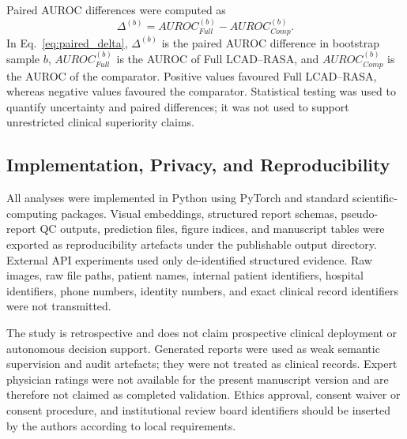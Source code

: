 Paired AUROC differences were computed as
\begin{equation}
\Delta^{(b)}=AUROC_{Full}^{(b)}-AUROC_{Comp}^{(b)}.
\label{eq:paired_delta}
\end{equation}
In Eq.~\eqref{eq:paired_delta}, \(\Delta^{(b)}\) is the paired AUROC difference in bootstrap sample \(b\), \(AUROC_{Full}^{(b)}\) is the AUROC of Full LCAD--RASA, and \(AUROC_{Comp}^{(b)}\) is the AUROC of the comparator. Positive values favoured Full LCAD--RASA, whereas negative values favoured the comparator. Statistical testing was used to quantify uncertainty and paired differences; it was not used to support unrestricted clinical superiority claims.

\subsection{Implementation, Privacy, and Reproducibility}
\label{subsec:methods_implementation}

All analyses were implemented in Python using PyTorch and standard scientific-computing packages. Visual embeddings, structured report schemas, pseudo-report QC outputs, prediction files, figure indices, and manuscript tables were exported as reproducibility artefacts under the publishable output directory. External API experiments used only de-identified structured evidence. Raw images, raw file paths, patient names, internal patient identifiers, hospital identifiers, phone numbers, identity numbers, and exact clinical record identifiers were not transmitted.

The study is retrospective and does not claim prospective clinical deployment or autonomous decision support. Generated reports were used as weak semantic supervision and audit artefacts; they were not treated as clinical records. Expert physician ratings were not available for the present manuscript version and are therefore not claimed as completed validation. Ethics approval, consent waiver or consent procedure, and institutional review board identifiers should be inserted by the authors according to local requirements.
